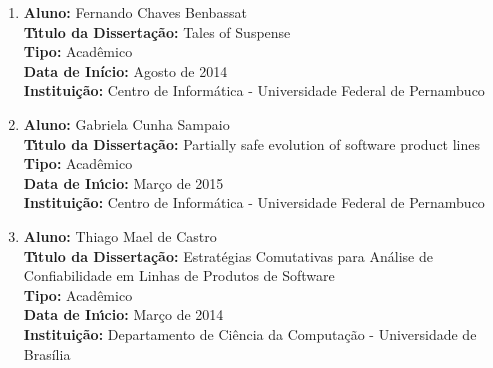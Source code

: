 \documentclass[a4paper,oneside,10pt]{article}
\begin{document}
\begin{enumerate}
\renewcommand{\labelenumi}{{\large\bfseries\arabic{enumi}.}}

\item       \textbf{Aluno:} Fernando Chaves Benbassat \mbox{} \\
            \textbf{T\'{\i}tulo da Disserta\c{c}\~{a}o:} Tales of Suspense\\
            \textbf{Tipo:} Acadêmico \\%
            \textbf{Data de Início:} Agosto de 2014 \\
            \textbf{Institui\c{c}\~{a}o:} Centro de Informática - Universidade Federal de Pernambuco

\item       \textbf{Aluno:} Gabriela Cunha Sampaio \mbox{}\\
            \textbf{T\'{\i}tulo da Disserta\c{c}\~{a}o:} Partially safe evolution of software product lines\\
            \textbf{Tipo:} Acadêmico \\%
            \textbf{Data de In\'{\i}cio:} Março de 2015\\
            \textbf{Institui\c{c}\~{a}o:} Centro de Informática - Universidade Federal de Pernambuco

\item       \textbf{Aluno:} Thiago Mael de Castro \mbox{}\\
            \textbf{T\'{\i}tulo da Disserta\c{c}\~{a}o:} Estratégias Comutativas para Análise de Confiabilidade em Linhas de Produtos de Software\\
            \textbf{Tipo:} Acadêmico \\%
            \textbf{Data de In\'{\i}cio:} Março de 2014\\
            \textbf{Institui\c{c}\~{a}o:} Departamento de Ciência da Computação - Universidade de Brasília

\end{enumerate}
\end{document}
